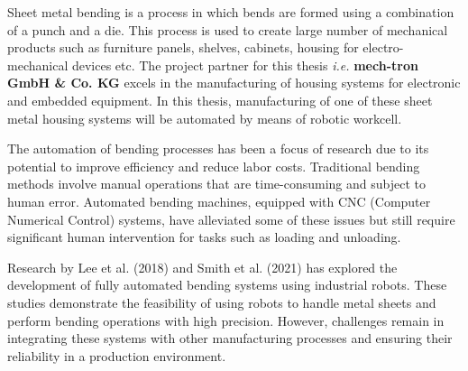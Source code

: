 Sheet metal bending is a process in which bends are formed using a combination of a punch and a die. This process is used to create large number of mechanical products such as furniture panels, shelves, cabinets, housing for electro-mechanical devices etc. \cite{alvaautomated}
The project partner for this thesis \textit{i.e.} \textbf{mech-tron GmbH \& Co. KG} excels in the manufacturing of housing systems for electronic and embedded equipment. In this thesis, manufacturing of one of these sheet metal housing systems will be automated by means of robotic workcell.



The automation of bending processes has been a focus of research due to its potential to improve efficiency and reduce labor costs. Traditional bending methods involve manual operations that are time-consuming and subject to human error. Automated bending machines, equipped with CNC (Computer Numerical Control) systems, have alleviated some of these issues but still require significant human intervention for tasks such as loading and unloading.

Research by Lee et al. (2018) and Smith et al. (2021) has explored the development of fully automated bending systems using industrial robots. These studies demonstrate the feasibility of using robots to handle metal sheets and perform bending operations with high precision. However, challenges remain in integrating these systems with other manufacturing processes and ensuring their reliability in a production environment.
